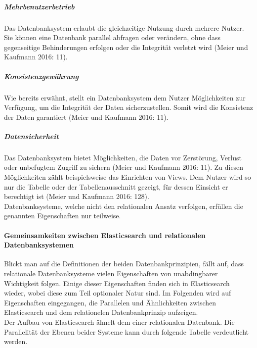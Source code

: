 \documentclass[a4paper]{scrartcl}
\begin{document}
\subparagraph{Mehrbenutzerbetrieb}
Das Datenbanksystem erlaubt die gleichzeitige Nutzung durch mehrere Nutzer. Sie können eine Datenbank parallel abfragen oder verändern, ohne dass gegenseitige Behinderungen erfolgen oder die Integrität verletzt wird (Meier und Kaufmann 2016: 11).

\subparagraph{Konsistenzgewährung}
Wie bereits erwähnt, stellt ein Datenbanksystem dem Nutzer Möglichkeiten zur Verfügung, um die Integrität der Daten sicherzustellen. Somit wird die Konsistenz der Daten garantiert (Meier und Kaufmann 2016: 11).

\subparagraph{Datensicherheit}
Das Datenbanksystem bietet Möglichkeiten, die Daten vor Zerstörung, Verlust oder unbefugtem Zugriff zu sichern (Meier und Kaufmann 2016: 11). Zu diesen Möglichkeiten zählt beispielsweise das Einrichten von Views. Dem Nutzer wird so nur die Tabelle oder der Tabellenausschnitt gezeigt, für dessen Einsicht er berechtigt ist (Meier und Kaufmann 2016: 128). \\ 

Datenbanksysteme, welche nicht den relationalen Ansatz verfolgen, erfüllen die genannten Eigenschaften nur teilweise.

\paragraph{Gemeinsamkeiten zwischen Elasticsearch und relationalen Datenbanksystemen}
Blickt man auf die Definitionen der beiden Datenbankprinzipien, fällt auf, dass relationale Datenbanksysteme vielen Eigenschaften von unabdingbarer Wichtigkeit folgen. Einige dieser Eigenschaften finden sich in Elasticsearch wieder, wobei diese zum Teil optionaler Natur sind. Im Folgenden wird auf Eigenschaften eingegangen, die Parallelen und Ähnlichkeiten zwischen Elasticsearch und dem relationelen Datenbankprinzip aufzeigen. \\
Der Aufbau von Elasticsearch ähnelt dem einer relationalen Datenbank. Die Parallelität der Ebenen beider Systeme kann durch folgende Tabelle verdeutlicht werden.
\end{document}
